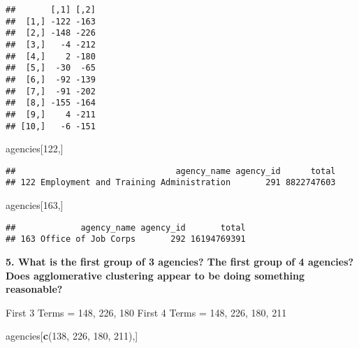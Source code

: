 \documentclass[]{article}
\newenvironment{Shaded}{\begin{snugshade}}{\end{snugshade}}
\newcommand{\CommentTok}[1]{\textcolor[rgb]{0.56,0.35,0.01}{\textit{#1}}}
\newcommand{\DataTypeTok}[1]{\textcolor[rgb]{0.13,0.29,0.53}{#1}}
\newcommand{\DecValTok}[1]{\textcolor[rgb]{0.00,0.00,0.81}{#1}}
\newcommand{\KeywordTok}[1]{\textcolor[rgb]{0.13,0.29,0.53}{\textbf{#1}}}
\newcommand{\NormalTok}[1]{#1}
\newcommand{\OperatorTok}[1]{\textcolor[rgb]{0.81,0.36,0.00}{\textbf{#1}}}
\newcommand{\StringTok}[1]{\textcolor[rgb]{0.31,0.60,0.02}{#1}}
\begin{document}
\begin{Shaded}
\end{Shaded}

\begin{verbatim}
##       [,1] [,2]
##  [1,] -122 -163
##  [2,] -148 -226
##  [3,]   -4 -212
##  [4,]    2 -180
##  [5,]  -30  -65
##  [6,]  -92 -139
##  [7,]  -91 -202
##  [8,] -155 -164
##  [9,]    4 -211
## [10,]   -6 -151
\end{verbatim}

\begin{Shaded}
\begin{Highlighting}[]
\NormalTok{agencies[}\DecValTok{122}\NormalTok{,]}
\end{Highlighting}
\end{Shaded}

\begin{verbatim}
##                                agency_name agency_id      total
## 122 Employment and Training Administration       291 8822747603
\end{verbatim}

\begin{Shaded}
\begin{Highlighting}[]
\NormalTok{agencies[}\DecValTok{163}\NormalTok{,]}
\end{Highlighting}
\end{Shaded}

\begin{verbatim}
##             agency_name agency_id       total
## 163 Office of Job Corps       292 16194769391
\end{verbatim}

\textbf{5. What is the first group of 3 agencies? The first group of 4
agencies? Does agglomerative clustering appear to be doing something
reasonable?}

First 3 Terms = 148, 226, 180 First 4 Terms = 148, 226, 180, 211

\begin{Shaded}
\begin{Highlighting}[]
\NormalTok{agencies[}\KeywordTok{c}\NormalTok{(}\DecValTok{138}\NormalTok{, }\DecValTok{226}\NormalTok{, }\DecValTok{180}\NormalTok{, }\DecValTok{211}\NormalTok{),]}
\end{Highlighting}
\end{Shaded}
\end{document}
